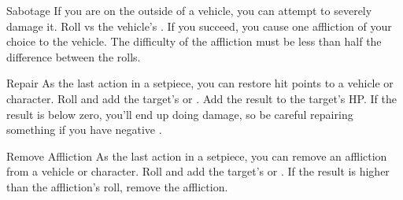 \begin{describe}{Sabotage}
  If you are on the outside of a vehicle, you can attempt to severely damage it. Roll  vs the vehicle's . If you succeed, you cause one affliction of your choice to the vehicle. The difficulty of the affliction must be less than half the difference between the rolls.
\end{describe}

\hr

\begin{describe}{Repair}
  As the last action in a setpiece, you can restore hit points to a vehicle or character. Roll  and add the target's  or . Add the result to the target's HP. If the result is below zero, you'll end up doing damage, so be careful repairing something if you have negative .
\end{describe}

\begin{describe}{Remove Affliction}
  As the last action in a setpiece, you can remove an affliction from a vehicle or character. Roll  and add the target's  or . If the result is higher than the affliction's  roll, remove the affliction.
\end{describe}
